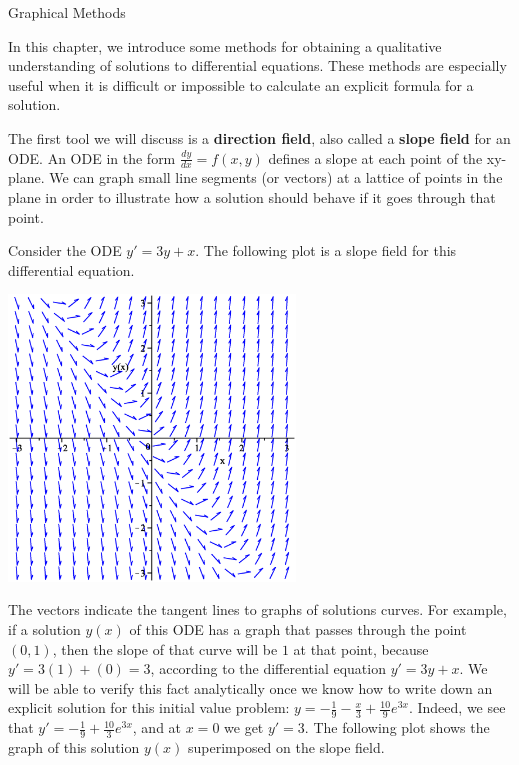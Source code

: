 \documentclass[12pt,letterpaper,twoside]{amsart}
\newcounter{example}
\newcounter{exercise}
\newcounter{problem}
\newcommand{\example}{\bigskip \noindent {\large {\sc Example \arabic{example}:}} \addtocounter{example}{1}}
\begin{document}
\sffamily

\begin{center} {\LARGE Graphical Methods} \end{center}

\setcounter{example}{1}
\setcounter{exercise}{1}

In this chapter, we introduce some methods for obtaining a qualitative understanding of solutions to differential equations.  These methods are especially useful when it is difficult or impossible to calculate an explicit formula for a solution.

The first tool we will discuss is a {\bf direction field}, also called a {\bf slope field} for an ODE.  An ODE in the form $\frac{dy}{dx}=f(x,y)$ defines a slope at each point of the xy-plane.  We can graph small line segments (or vectors) at a lattice of points in the plane in order to illustrate how a solution should behave if it goes through that point.

\example Consider the ODE $y'=3y+x$.  The following plot is a slope field for this differential equation.

\begin{center}
\includegraphics[width=3in]{slopefield1.eps}
\end{center}

The vectors indicate the tangent lines to graphs of solutions curves.  For example, if a solution $y(x)$ of this ODE has a graph that passes through the point $(0,1)$, then the slope of that curve will be $1$ at that point, because $y'=3(1)+(0)=3$, according to the differential equation $y'=3y+x$.  We will be able to verify this fact analytically once we know how to write down an explicit solution for this initial value problem: $y=-\frac{1}{9}-\frac{x}{3}+\frac{10}{9}e^{3x}$.  Indeed, we see that $y'=-\frac{1}{9}+\frac{10}{3}e^{3x}$, and at $x=0$ we get $y'=3$.  The following plot shows the graph of this solution $y(x)$ superimposed on the slope field.
\end{document}
